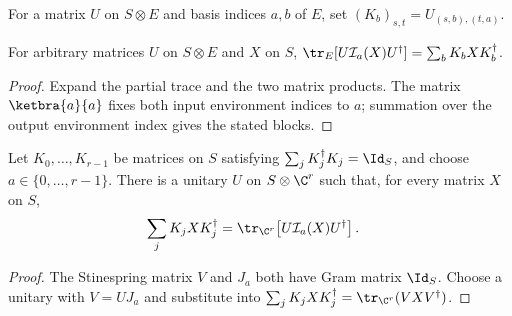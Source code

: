 \begin{definition}
    \label{def:initialized_environment_blocks}
    \leanok
    For a matrix $U$ on $S\otimes E$ and basis indices $a,b$ of $E$, set
    $(K_b)_{s,t}=U_{(s,b),(t,a)}$.
\end{definition}

\begin{theorem}
    \label{thm:initialized_environment_blocks}
    \leanok
    For arbitrary matrices $U$ on $S\otimes E$ and $X$ on $S$,
    $\tr_E[U\mathcal I_a(X)U^\dagger]=\sum_bK_bXK_b^\dagger$.
\end{theorem}
\begin{proof}\leanok
    Expand the partial trace and the two matrix products.
    The matrix $\ketbra{a}{a}$ fixes both input environment indices to $a$;
    summation over the output environment index gives the stated blocks.
\end{proof}

\begin{theorem}
    \label{thm:fixed_input_kraus_dilation}
    \leanok
    Let $K_0,\ldots,K_{r-1}$ be matrices on $S$ satisfying
    $\sum_jK_j^\dagger K_j=\Id_S$, and choose $a\in\{0,\ldots,r-1\}$.
    There is a unitary $U$ on $S\otimes\C^r$ such that, for every
    matrix $X$ on $S$,
    \begin{align}
        \sum_jK_jXK_j^\dagger
         & =\tr_{\C^r}\!\left[U\mathcal I_a(X)U^\dagger\right].
        \label{eq:representations_fixed_input_kraus}
    \end{align}
\end{theorem}
\begin{proof}\leanok
    The Stinespring matrix $V$ and $J_a$ both have Gram matrix $\Id_S$.
    Choose a unitary with $V=UJ_a$ and substitute into
    $\sum_jK_jXK_j^\dagger=\tr_{\C^r}(VXV^\dagger)$.
\end{proof}

